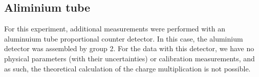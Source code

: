 \subsection{Aliminium tube}
For this experiment, additional measurements were performed with an aluminuium tube proportional counter detector. In this case, the aluminium detector was assembled by group 2. For the data with this detector, we have no physical parameters (with their uncertainties) or calibration measurements, and as such, the theoretical calculation of the charge multiplication is not possible.

